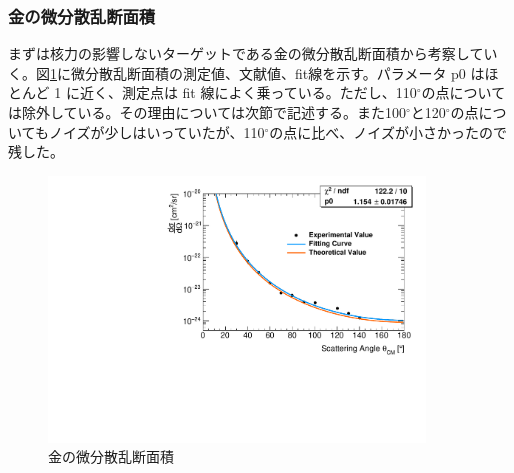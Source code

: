 \documentclass[a4paper,11pt,dvipdfmx]{jsarticle}
\begin{document}
\subsubsection{金の微分散乱断面積}
まずは核力の影響しないターゲットである金の微分散乱断面積から考察していく。図\ref{aucs}に微分散乱断面積の測定値、文献値、fit線を示す。パラメータ p0 はほとんど 1 に近く、測定点は fit 線によく乗っている。ただし、110$^{\circ}$の点については除外している。その理由については次節で記述する。また100$^\circ$と120$^\circ$の点についてもノイズが少しはいっていたが、110$^\circ$の点に比べ、ノイズが小さかったので残した。
\begin{figure}[H]
\centering
\includegraphics[width=100mm]{picture/jan/Au_CM.pdf}
\caption{金の微分散乱断面積}
\label{aucs}
\end{figure}
\end{document}
